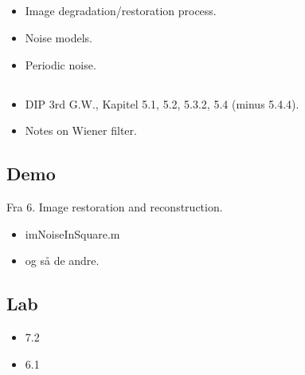 \subsection{\subtopics}

\begin{itemize}
	\item Image degradation/restoration process.
	\item Noise models.
	\item Periodic noise.
\end{itemize}

\subsection{\curriculum}

\begin{itemize}
	\item DIP 3rd G.W., Kapitel 5.1, 5.2, 5.3.2, 5.4 (minus 5.4.4).
	\item Notes on Wiener filter.
\end{itemize}

\subsection{Demo}

Fra 6. Image restoration and reconstruction.

\begin{itemize}
	\item imNoiseInSquare.m
	\item og så de andre.
\end{itemize}

\subsection{Lab}

\begin{itemize}
	\item 7.2
	\item 6.1
\end{itemize}
